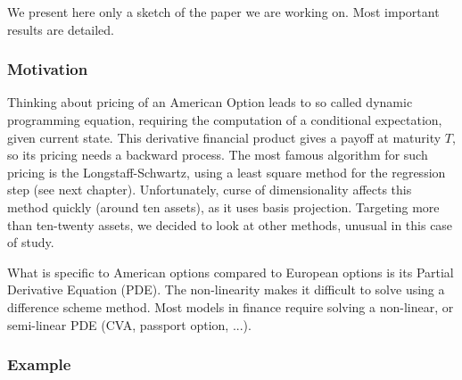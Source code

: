 We present here only a sketch of the paper we are working on. 
Most important results are detailed. 

\subsubsection{Motivation}

Thinking about pricing of an American Option leads to so called dynamic programming equation, requiring the computation of a conditional expectation, given current state. This derivative financial product gives a payoff at maturity $T$, so its pricing needs a backward process. 
The most famous algorithm for such pricing is the Longstaff-Schwartz, using a least square method for the regression step (see next chapter). Unfortunately, curse of dimensionality affects this method quickly (around ten assets), as it uses basis projection. 
Targeting more than ten-twenty assets, we decided to look at other methods, unusual in this case of study. 	

What is specific to American options compared to European options is its Partial Derivative Equation (PDE). The non-linearity makes it difficult to solve using a difference scheme method.
Most models in finance require solving a non-linear, or semi-linear PDE (CVA, passport option, ...). 

\subsubsection{Example}


\cite{Einstein}
